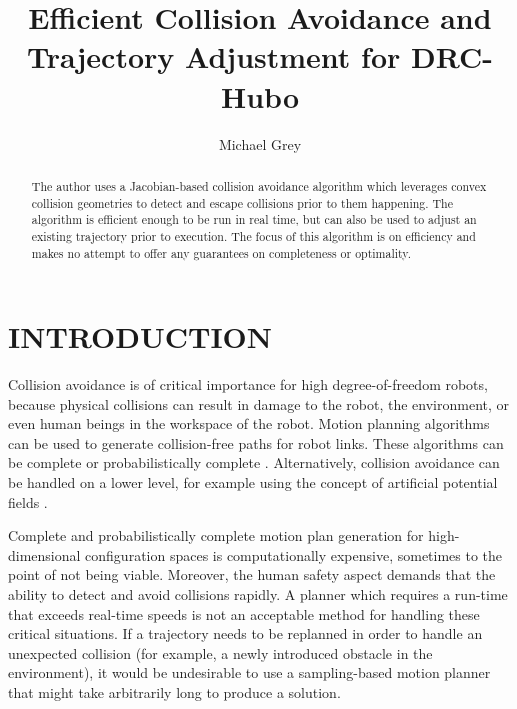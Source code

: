 \documentclass[letterpaper, 10 pt, conference]{ieeeconf}  %
\title{\LARGE \bf
Efficient Collision Avoidance and Trajectory Adjustment for DRC-Hubo
}
\author{Michael Grey%
}
\begin{document}
\maketitle
\thispagestyle{empty}
\pagestyle{empty}


\begin{abstract}

The author uses a Jacobian-based collision avoidance algorithm which leverages convex collision geometries to detect and escape collisions prior to them happening. The algorithm is efficient enough to be run in real time, but can also be used to adjust an existing trajectory prior to execution. The focus of this algorithm is on efficiency and makes no attempt to offer any guarantees on completeness or optimality. 

\end{abstract}


\section{INTRODUCTION}

Collision avoidance is of critical importance for high degree-of-freedom robots, because physical collisions can result in damage to the robot, the environment, or even human beings in the workspace of the robot. Motion planning algorithms can be used to generate collision-free paths for robot links. These algorithms can be complete \cite{Lozano} or probabilistically complete \cite{PRM}\cite{RRT}. Alternatively, collision avoidance can be handled on a lower level, for example using the concept of artificial potential fields \cite{Khatib}.

Complete and probabilistically complete motion plan generation for high-dimensional configuration spaces is computationally expensive, sometimes to the point of not being viable. Moreover, the human safety aspect demands that the ability to detect and avoid collisions rapidly. A planner which requires a run-time that exceeds real-time speeds is not an acceptable method for handling these critical situations. If a trajectory needs to be replanned in order to handle an unexpected collision (for example, a newly introduced obstacle in the environment), it would be undesirable to use a sampling-based motion planner that might take arbitrarily long to produce a solution. 
\end{document}
